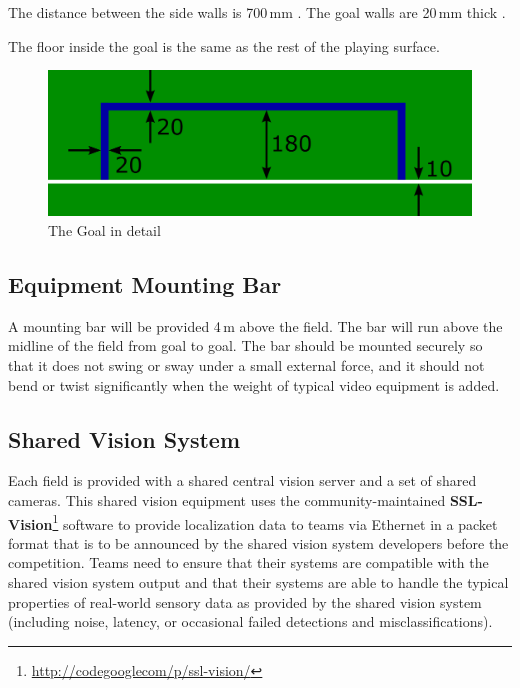 The distance between the side walls is 700\,mm .
The goal walls are 20\,mm thick .

The floor inside the goal is the same as the rest of the playing surface.


\begin{figure}[ht] %
	\centering
	\includegraphics[width=0.5\columnwidth]{img/goal_detail.png}
	\caption{The Goal in detail}
	\label{fig:sslgoal}
\end{figure}

\subsection{Equipment Mounting Bar}
A mounting bar will be provided 4\,m above the field.
The bar will run above the midline of the field from goal to goal.
The bar should be mounted securely so that it does not swing or sway under a small external force, and it should not bend or twist significantly when the weight of typical video equipment is added.

\subsection{Shared Vision System}
Each field is provided with a shared central vision server and a set of shared cameras.
This shared vision equipment uses the community-maintained \textbf{SSL-Vision}\footnote{\url{http://codegooglecom/p/ssl-vision/}} software to provide localization data to teams via Ethernet in a packet format that is to be announced by the shared vision system developers before the competition.
Teams need to ensure that their systems are compatible with the shared vision system output and that their systems are able to handle the typical properties of real-world sensory data as provided by the shared vision system (including noise, latency, or occasional failed detections and misclassifications).

